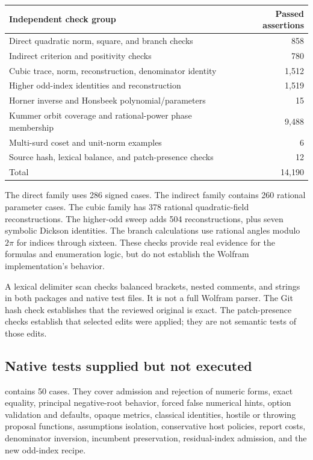 \documentclass[11pt,a4paper]{article}
\newcommand{\code}[1]{\texttt{\detokenize{#1}}}
\theoremstyle{remark}\newtheorem{remark}[theorem]{Remark}
\begin{document}
\begin{center}
\begin{tabular}{@{}lr@{}}
\toprule Independent check group & Passed assertions\\\midrule
Direct quadratic norm, square, and branch checks & 858\\
Indirect criterion and positivity checks & 780\\
Cubic trace, norm, reconstruction, denominator identity & 1,512\\
Higher odd-index identities and reconstruction & 1,519\\
Horner inverse and Honsbeek polynomial/parameters & 15\\
Kummer orbit coverage and rational-power phase membership & 9,488\\
Multi-surd coset and unit-norm examples & 6\\
Source hash, lexical balance, and patch-presence checks & 12\\\midrule
Total & 14,190\\\bottomrule
\end{tabular}
\end{center}

The direct family uses 286 signed cases. The indirect family contains 260 rational parameter cases. The cubic family has 378 rational quadratic-field reconstructions. The higher-odd sweep adds 504 reconstructions, plus seven symbolic Dickson identities. The branch calculations use rational angles modulo $2\pi$ for indices through sixteen. These checks provide real evidence for the formulas and enumeration logic, but do not establish the Wolfram implementation's behavior.

A lexical delimiter scan checks balanced brackets, nested comments, and strings in both packages and native test files. It is not a full Wolfram parser. The Git hash check establishes that the reviewed original is exact. The patch-presence checks establish that selected edits were applied; they are not semantic tests of those edits.

\subsection{Native tests supplied but not executed}
\code{tests/StradFixed3.wlt} contains 50 \code{VerificationTest} cases. They cover admission and rejection of numeric forms, exact equality, principal negative-root behavior, forced false numerical hints, option validation and defaults, opaque metrics, classical identities, hostile or throwing proposal functions, assumptions isolation, conservative host policies, report costs, denominator inversion, incumbent preservation, residual-index admission, and the new odd-index recipe.
\end{document}
